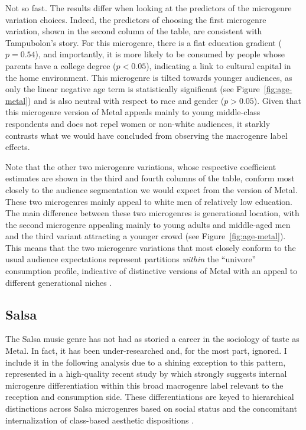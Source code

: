 \documentclass[a4paper,12pt]{extarticle}
\begin{document}
Not so fast. The results differ when looking at the predictors of the microgenre variation choices. Indeed, the predictors of choosing the first microgenre variation, shown in the second column of the table, are consistent with Tampubolon's story. For this microgenre, there is a flat education gradient ($p = 0.54$), and importantly, it is more likely to be consumed by people whose parents have a college degree ($p < 0.05$), indicating a link to cultural capital in the home environment. This microgenre is tilted towards younger audiences, as only the linear negative age term is statistically significant (see Figure~\ref{fig:age-metal}) and is also neutral with respect to race and gender ($p > 0.05$). Given that this microgenre version of Metal appeals mainly to young middle-class respondents and does not repel women or non-white audiences, it starkly contrasts what we would have concluded from observing the macrogenre label effects. 

Note that the other two microgenre variations, whose respective coefficient estimates are shown in the third and fourth columns of the table, conform most closely to the audience segmentation we would expect from the version of Metal. These two microgenres mainly appeal to white men of relatively low education. The main difference between these two microgenres is generational location, with the second microgenre appealing mainly to young adults and middle-aged men and the third variant attracting a younger crowd (see Figure~\ref{fig:age-metal}). This means that the two microgenre variations that most closely conform to the usual audience expectations represent partitions \textit{within} the ``univore'' consumption profile, indicative of distinctive versions of Metal with an appeal to different generational niches \citep{koch2020evolutionary}. 

\subsection{Salsa}
The Salsa music genre has not had as storied a career in the sociology of taste as Metal. In fact, it has been under-researched and, for the most part, ignored. I include it in the following analysis due to a shining exception to this pattern, represented in a high-quality recent study by \citep{Bachmayer2014-pk} which strongly suggests internal microgenre differentiation within this broad macrogenre label relevant to the reception and consumption side. These differentiations are keyed to hierarchical distinctions across Salsa microgenres based on social status and the concomitant internalization of class-based aesthetic dispositions \citep{lizardo2012reconceptualizing}. 
\end{document}

